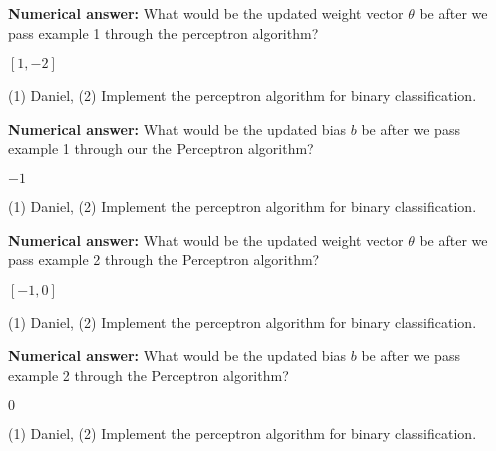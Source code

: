 \begin{questions}

\question[1] \textbf{Numerical answer:} What would be the updated weight vector $\theta$ be after we pass example 1 through the perceptron algorithm?
    \begin{tcolorbox}[fit,height=1cm, width=3cm, blank, borderline={1pt}{-2pt}]
    \end{tcolorbox}
    \begin{soln}
    $[1,-2]$
    \end{soln}
    \begin{qauthor}
    (1) Daniel, (2) Implement the perceptron algorithm for binary
classification.
    \end{qauthor}
    
\question[1] \textbf{Numerical answer:} What would be the updated bias $b$ be after we pass example 1 through our the Perceptron algorithm?
    \begin{tcolorbox}[fit,height=1cm, width=2cm, blank, borderline={1pt}{-2pt}]
    \end{tcolorbox}
    \begin{soln}
    $-1$
    \end{soln}
    \begin{qauthor}
    (1) Daniel, (2) Implement the perceptron algorithm for binary
classification.
    \end{qauthor}

\question[1] \textbf{Numerical answer:} What would be the updated weight vector $\theta$ be after we pass example 2 through the Perceptron algorithm?
    \begin{tcolorbox}[fit,height=1cm, width=3cm, blank, borderline={1pt}{-2pt}]
    \end{tcolorbox}
    \begin{soln}
    $[-1,0]$
    \end{soln}
    \begin{qauthor}
    (1) Daniel, (2) Implement the perceptron algorithm for binary
classification.
    \end{qauthor}
    
\question[1] \textbf{Numerical answer:} What would be the updated bias $b$ be after we pass example 2 through the Perceptron algorithm?
    \begin{tcolorbox}[fit,height=1cm, width=2cm, blank, borderline={1pt}{-2pt}]
    \end{tcolorbox}
    \begin{soln}
    $0$
    \end{soln}
    \begin{qauthor}
    (1) Daniel, (2) Implement the perceptron algorithm for binary
classification.
    \end{qauthor}
    

\end{questions}
